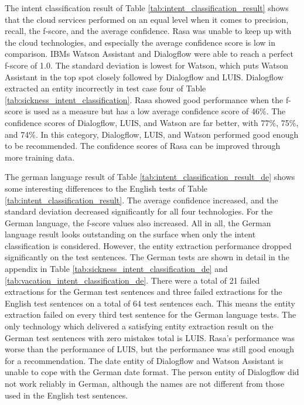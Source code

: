The intent classification result of Table \ref{tab:intent_classification_result} shows that the cloud services performed on an equal level when it comes to precision, recall, the f-score, and the average confidence.
Rasa was unable to keep up with the cloud technologies, and especially the average confidence score is low in comparison.
IBMs Watson Assistant and Dialogflow were able to reach a perfect f-score of 1.0.
The standard deviation is lowest for Watson, which puts Watson Assistant in the top spot closely followed by Dialogflow and LUIS.
Dialogflow extracted an entity incorrectly in test case four of Table \ref{tab:sickness_intent_classification}.
Rasa showed good performance when the f-score is used as a measure but has a low average confidence score of 46\%.
The confidence scores of Dialogflow, LUIS, and Watson are far better, with 77\%, 75\%, and 74\%.
In this category, Dialogflow, LUIS, and Watson performed good enough to be recommended.
The confidence scores of Rasa can be improved through more training data.

The german language result of Table \ref{tab:intent_classification_result_de} shows some interesting 
differences to the English tests of Table \ref{tab:intent_classification_result}.
The average confidence increased, and the standard deviation decreased significantly for all four technologies.
For the German language, the f-score values also increased.
All in all, the German language result looks outstanding on the surface when only the intent classification is considered.
However, the entity extraction performance dropped significantly on the test sentences.
The German tests are shown in detail in the appendix in Table \ref{tab:sickness_intent_classification_de} and \ref{tab:vacation_intent_classification_de}.
There were a total of 21 failed extractions for the German test sentences and three failed extractions for the English test sentences on a total of 64 test sentences each.
This means the entity extraction failed on every third test sentence for the German language tests.
The only technology which delivered a satisfying entity extraction result on the German test sentences with zero mistakes total is LUIS.
Rasa's performance was worse than the performance of LUIS, but the performance was still good enough for a recommendation.
The date entity of Dialogflow and Watson Assistant is unable to cope with the German date format.
The person entity of Dialogflow did not work reliably in German, although the names are not different from those used in the English test sentences.

